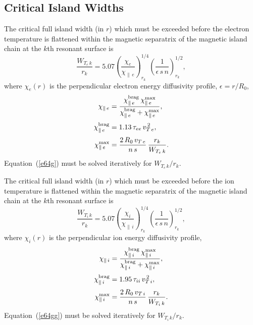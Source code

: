 \documentclass[notitlepage,12pt]{article}
\begin{document}
\subsection{Critical Island Widths}
The critical full island width (in $r$) which must be exceeded before the electron temperature is flattened within the
magnetic separatrix of the magnetic island chain at the $k$th resonant surface is
\begin{equation}\label{e64g}
\frac{W_{T_e\,k} }{r_k}= 5.07\left(\frac{\chi_e}{\chi_{\parallel\,e}}\right)^{1/4}_{r_k}\left(\frac{1}{\epsilon\,s\,n}\right)^{1/2}_{r_k},
\end{equation}
where $\chi_e(r)$ is the perpendicular electron energy diffusivity profile, $\epsilon =r/R_0$, 
\begin{align}
\chi_{\parallel\,e}&= \frac{\chi_{\parallel\,e}^{\rm brag}\,\chi_{\parallel\,e}^{\rm max}}{\chi_{\parallel\,e}^{\rm brag}+\chi_{\parallel\,e}^{\rm max}},\\[0.5ex]
\chi_{\parallel\,e}^{\rm brag} &= 1.13\,\tau_{ee}\,v_{T\,e}^{\,2},\\[0.5ex]
\chi_{\parallel\,e}^{\rm max} &= \frac{2\,R_0\,v_{T\,e}}{n\,s}\,\frac{r_k}{W_{T_e\,k}}.
\end{align}
Equation~(\ref{e64g}) must be solved iteratively for $W_{T_e\,k}/r_k$. 

The critical full island width (in $r$) which must be exceeded before the ion temperature is flattened within the
magnetic separatrix of the magnetic island chain at the $k$th resonant surface is
\begin{equation}\label{e64gg}
\frac{W_{T_i\,k} }{r_k}= 5.07\left(\frac{\chi_i}{\chi_{\parallel\,i}}\right)^{1/4}_{r_k}\left(\frac{1}{\epsilon\,s\,n}\right)^{1/2}_{r_k},
\end{equation}
where $\chi_i(r)$ is the perpendicular ion energy diffusivity profile, 
\begin{align}
\chi_{\parallel\,i}&= \frac{\chi_{\parallel\,i}^{\rm brag}\,\chi_{\parallel\,i}^{\rm max}}{\chi_{\parallel\,i}^{\rm brag}+\chi_{\parallel\,i}^{\rm max}},\\[0.5ex]
\chi_{\parallel\,i}^{\rm brag} &= 1.95\,\tau_{ii}\,v_{T\,i}^{\,2},\\[0.5ex]
\chi_{\parallel\,i}^{\rm max} &= \frac{2\,R_0\,v_{T\,i}}{n\,s}\,\frac{r_k}{W_{T_i\,k}}.
\end{align}
Equation~(\ref{e64gg}) must be solved iteratively for $W_{T_i\,k}/r_k$.
\end{document}
